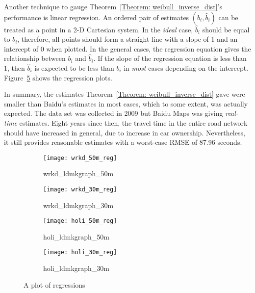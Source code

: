 Another technique to gauge Theorem~\ref{Theorem: weibull_inverse_dist}'s performance is linear regression. An ordered pair of estimates $(b_{i}, \hat{b}_{i})$ can be treated as a point in a 2-D Cartesian system. In the \emph{ideal} case, $\hat{b}_{i}$ should be equal to $b_{i}$, therefore, all points should form a straight line with a slope of 1 and an intercept of 0 when plotted. In the general cases, the regression equation gives the relationship between $b_{i}$ and $\hat{b}_{i}$. If the slope of the regression equation is less than 1, then $\hat{b}_{i}$ is expected to be less than $b_{i}$ in \emph{most} cases depending on the intercept. Figure~\ref{Fig:regression_plot} shows the regression plots. 

In summary, the estimates Theorem~\ref{Theorem: weibull_inverse_dist} gave were smaller than Baidu's estimates in most cases, which to some extent, was actually expected. The data set was collected in 2009 but Baidu Maps was giving \emph{real-time} estimates. Eight years since then, the travel time in the entire road network should have increased in general, due to increase in car ownership. Nevertheless, it still provides reasonable estimates with a worst-case RMSE of 87.96 seconds. 

\begin{figure}[h!]
\begin{subfigure}{.5\textwidth}
\centering
\texttt{[image: wrkd\_50m\_reg]}
\caption{wrkd\_ldmkgraph\_50m}
\label{Fig:wrkd_50m_reg}
\end{subfigure}
\begin{subfigure}{.5\textwidth}
\centering
\texttt{[image: wrkd\_30m\_reg]}
\caption{wrkd\_ldmkgraph\_30m}
\label{Fig:wrkd_30m_reg}
\end{subfigure}

\begin{subfigure}{.5\textwidth}
\centering
\texttt{[image: holi\_50m\_reg]}
\caption{holi\_ldmkgraph\_50m}
\label{Fig:holi_50m_reg}
\end{subfigure}
\begin{subfigure}{.5\textwidth}
\centering
\texttt{[image: holi\_30m\_reg]}
\caption{holi\_ldmkgraph\_30m}
\label{Fig:holi_30m_reg}
\end{subfigure}

\caption{A plot of regressions}
\label{Fig:regression_plot}
\end{figure}